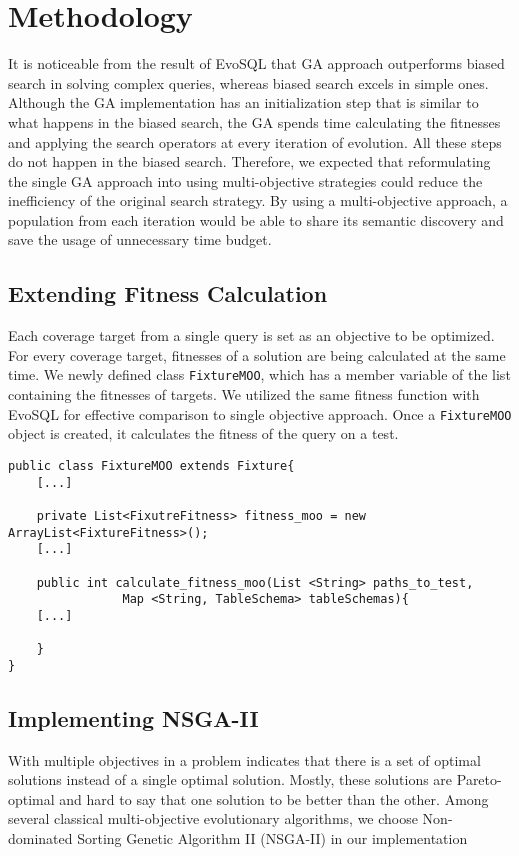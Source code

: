 \chapter{Methodology}
\label{cha:methodology}

It is noticeable from the result of EvoSQL that GA approach outperforms biased search in solving complex queries, whereas biased search excels in simple ones. Although the GA implementation has an initialization step that is similar to what happens in the biased search, the GA spends time calculating the fitnesses and applying the search operators at every iteration of evolution. All these steps do not happen in the biased search. Therefore, we expected that reformulating the single GA approach into using multi-objective strategies could reduce the inefficiency of the original search strategy. By using a multi-objective approach, a population from each iteration would be able to share its semantic discovery and save the usage of unnecessary time budget.

\section{Extending Fitness Calculation}
\label{sec:FixtureMOO}
Each coverage target from a single query is set as an objective to be optimized. For every coverage target, fitnesses of a solution are being calculated at the same time. We newly defined class \verb|FixtureMOO|, which has a member variable of the list containing the fitnesses of targets. We utilized the same fitness function with EvoSQL for effective comparison to single objective approach. Once a  \verb|FixtureMOO| object is created, it calculates the fitness of the query on a test.

\newline

\begin{lstlisting}[caption = FixtureMOO.java, captionpos  = b]
public class FixtureMOO extends Fixture{
	[...]
	
	private List<FixutreFitness> fitness_moo = new ArrayList<FixtureFitness>();
	[...]
	
	public int calculate_fitness_moo(List <String> paths_to_test, 
				Map <String, TableSchema> tableSchemas){
	[...]
	
	}
}
\end{lstlisting}


\section{Implementing NSGA-II}
\label{sec:nsga}
With multiple objectives in a problem indicates that there is a set of optimal solutions instead of a single optimal solution. Mostly, these solutions are Pareto-optimal and hard to say that one solution to be better than the other. Among several classical multi-objective evolutionary algorithms, we choose Non-dominated Sorting Genetic Algorithm II (NSGA-II) in our implementation

